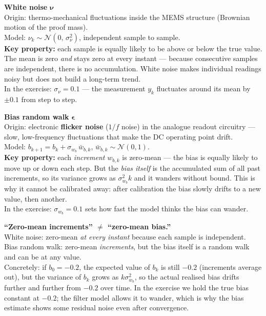 \documentclass[12pt, a4paper]{article}
\begin{document}
\begin{defbox}
  \textbf{White noise} $\boldsymbol{\nu}$\\
  Origin: thermo-mechanical fluctuations inside the MEMS structure
  (Brownian motion of the proof mass).\\
  Model: $\nu_k \sim \mathcal{N}(0,\,\sigma_\nu^2)$, independent
  sample to sample.\\[4pt]
  \textbf{Key property:} each sample is equally likely to be above
  or below the true value.
  The mean is zero \emph{and} stays zero at every instant --- because
  consecutive samples are independent, there is no accumulation.
  White noise makes individual readings noisy but does not build a
  long-term trend.\\[4pt]
  In the exercise: $\sigma_\nu = 0.1$ --- the measurement $y_k$
  fluctuates around its mean by $\pm 0.1$ from step to step.
\end{defbox}

\begin{defbox}
  \textbf{Bias random walk} $\boldsymbol{\epsilon}$\\
  Origin: electronic \textbf{flicker noise} ($1/f$ noise) in the
  analogue readout circuitry --- slow, low-frequency fluctuations
  that make the DC operating point drift.\\
  Model: $b_{k+1} = b_k + \sigma_{w_b}\,\bar{w}_{b,k}$,\quad
  $\bar{w}_{b,k} \sim \mathcal{N}(0,1)$.\\[4pt]
  \textbf{Key property:} each \emph{increment} $w_{b,k}$ is
  zero-mean --- the bias is equally likely to move up or down each
  step.
  But the \emph{bias itself} is the accumulated sum of all past
  increments, so its variance grows as $\sigma_{w_b}^2 k$ and it
  wanders without bound.
  This is why it cannot be calibrated away: after calibration the
  bias slowly drifts to a new value, then another.\\[4pt]
  In the exercise: $\sigma_{w_b} = 0.1$ sets how fast the model
  thinks the bias can wander.
\end{defbox}

\begin{warnbox}
  \textbf{``Zero-mean increments'' $\neq$ ``zero-mean bias.''}\\
  White noise: zero-mean \emph{at every instant} because each sample
  is independent.\\
  Bias random walk: zero-mean \emph{increments}, but the bias
  itself is a random walk and can be at any value.\\[4pt]
  Concretely: if $b_0 = -0.2$, the expected value of $b_k$ is still
  $-0.2$ (increments average out), but the variance of $b_k$
  grows as $k\sigma_{w_b}^2$, so the actual realised bias drifts
  further and further from $-0.2$ over time.
  In the exercise we hold the true bias constant at $-0.2$; the
  filter model allows it to wander, which is why the bias estimate
  shows some residual noise even after convergence.
\end{warnbox}
\end{document}
